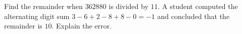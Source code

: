 Find the remainder when $362880$ is divided by $11$. A student computed the alternating digit sum $3-6+2-8+8-0=-1$ and concluded that the remainder is $10$. Explain the error.
